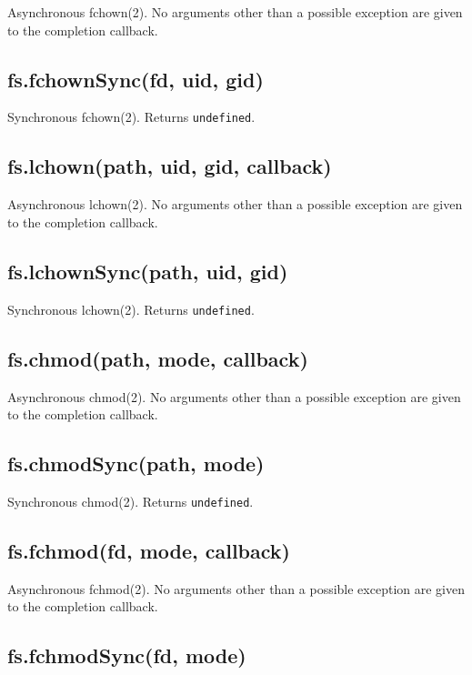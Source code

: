 Asynchronous fchown(2). No arguments other than a possible exception are
given to the completion callback.

\subsection{fs.fchownSync(fd, uid, gid)}\label{fs.fchownsyncfd-uid-gid}

Synchronous fchown(2). Returns \texttt{undefined}.

\subsection{fs.lchown(path, uid, gid,
callback)}\label{fs.lchownpath-uid-gid-callback}

Asynchronous lchown(2). No arguments other than a possible exception are
given to the completion callback.

\subsection{fs.lchownSync(path, uid,
gid)}\label{fs.lchownsyncpath-uid-gid}

Synchronous lchown(2). Returns \texttt{undefined}.

\subsection{fs.chmod(path, mode,
callback)}\label{fs.chmodpath-mode-callback}

Asynchronous chmod(2). No arguments other than a possible exception are
given to the completion callback.

\subsection{fs.chmodSync(path, mode)}\label{fs.chmodsyncpath-mode}

Synchronous chmod(2). Returns \texttt{undefined}.

\subsection{fs.fchmod(fd, mode,
callback)}\label{fs.fchmodfd-mode-callback}

Asynchronous fchmod(2). No arguments other than a possible exception are
given to the completion callback.

\subsection{fs.fchmodSync(fd, mode)}\label{fs.fchmodsyncfd-mode}

